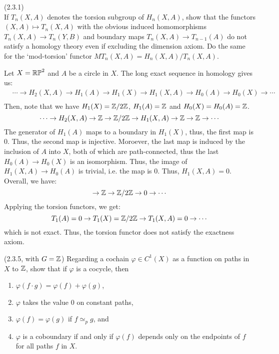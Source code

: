 \documentclass[12pt]{article}
\begin{document}



\begin{problem}{1}(2.3.1) \\
    If $T_n(X,A)$ denotes the torsion subgroup of $H_n(X,A)$, show that the functors $(X,A) \mapsto T_n(X,A)$ with the obvious induced homomorphisms $T_n(X,A) \to T_n(Y,B)$ and boundary maps $T_n(X,A) \to T_{n-1}(A)$ do not satisfy a homology theory even if excluding the dimension axiom. Do the same for the `mod-torsion' functor $MT_n(X,A) = H_n(X,A)/T_n(X,A)$. 
\end{problem}

\begin{solution}
    Let $X = \mathbb{RP}^2$ and $A$ be a circle in $X$. The long exact sequence in homology gives us:
    \begin{align*}
        &\cdots \to H_2(X, A) \to H_1(A) \to H_1(X) \to H_1(X, A) \to H_0(A) \to H_0(X) \to \cdots \\
    \end{align*}
    Then, note that we have $H_1(X) = \mathbb Z/2\mathbb Z$, $H_1(A) = \mathbb Z$ and $H_0(X) = H_0(A) = \mathbb Z$.
    \[ \cdots \to H_2(X, A) \to \mathbb Z \to \mathbb Z/2\mathbb Z \to H_1(X, A) \to \mathbb Z \to \mathbb Z \to \cdots\]
    The generator of $H_1(A)$ maps to a boundary in $H_1(X)$, thus, the first map is $0$. Thus, the second map is injective. Moroever, the last map is induced by the inclusion of $A$ into $X$, both of which are path-connected, thus the last $H_0(A) \to H_0(X)$ is an isomorphism. Thus, the image of $H_1(X, A) \to H_0(A)$ is trivial, i.e. the map is $0$. Thus, $H_1(X, A) = 0$. Overall, we have:
    \[ \to \mathbb Z \to \mathbb Z/2\mathbb Z \to 0 \to \cdots\]
    Applying the torsion functors, we get:
    \[ T_1(A) = 0 \to T_1(X) = \mathbb Z/2\mathbb Z \to T_1(X,A) = 0 \to \cdots \]
    which is not exact. Thus, the torsion functor does not satisfy the exactness axiom.
\end{solution}
\newpage

\begin{problem}{2}(2.3.5, with $G= \mathbb Z$) 
    Regarding a cochain $\varphi \in C^1(X)$ as a function on paths in $X$ to $\mathbb Z$, show that if $\varphi$ is a cocycle, then 
    \begin{enumerate}
    \item $\varphi(f \cdot g) = \varphi(f) + \varphi(g)$,
    \item $\varphi$ takes the value $0$ on constant paths,
    \item $\varphi(f) = \varphi(g)$ if $f \simeq_p g$, and
    \item $\varphi$ is a coboundary if and only if $\varphi(f)$ depends only on the endpoints of $f$ for all paths $f$ in $X$.
    \end{enumerate}
\end{problem}
\end{document}
